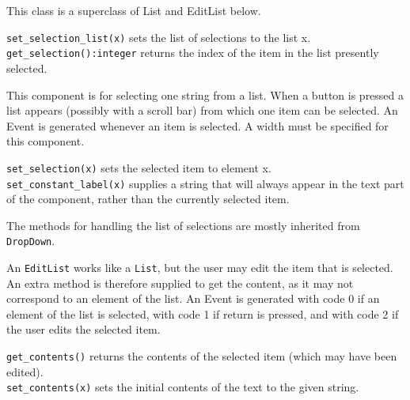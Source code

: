 
This class is a superclass of List and EditList below.

\texttt{set\_selection\_list(x)} sets the list of selections to the list
x.\\
\texttt{get\_selection():integer} returns the index of the item in the
list presently selected.


This component is for selecting one string from a list. When
a button is pressed a list appears (possibly with a scroll bar) from
which one item can be selected. An Event is generated whenever an item
is selected. A width must be specified for this component.

\texttt{set\_selection(x)} sets the selected item to element x.\\
\texttt{set\_constant\_label(x)} supplies a string that will always appear in
the text part of the component, rather than the currently selected item.

The methods for handling the list of selections are mostly
inherited from \texttt{DropDown}.



An \texttt{EditList} works like a \texttt{List}, but the user may
edit the item that is selected. An extra method is therefore supplied
to get the content, as it may not correspond to an element of the list.
An Event is generated with code 0 if an element of the list is
selected, with code 1 if return is pressed, and with code 2 if the user
edits the selected item.

\texttt{get\_contents()} returns the contents of the selected item (which may
have been edited).\\
\texttt{set\_contents(x)} sets the initial contents of the text to the given
string.


